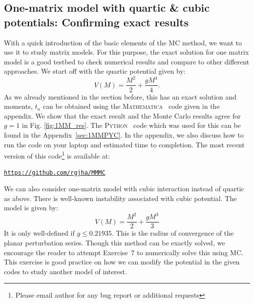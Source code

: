 \documentclass[11pt]{article}
\newcommand{\MA}{\textsc{Mathematica}}
\newcommand{\PY}{\textsc{Python}}
\begin{document}
\subsection{One-matrix model with quartic \& cubic potentials: Confirming exact results} 
With a quick introduction of the basic elements of the MC method, we want to use it to study matrix models. For this purpose, 
the exact solution for one matrix model is a good testbed to check numerical results and compare to other different approaches. 
We start off with the quartic potential given by:
\begin{equation}
	V(M) = \frac{M^2}{2} + \frac{gM^4}{4}.  
\end{equation}
As we already mentioned in the section before, this has an exact solution and moments, $t_{n}$ 
can be obtained using the \MA~ code given in the appendix. We show that the exact result and the 
Monte Carlo results agree for $g=1$ in Fig. \ref{fig:1MM_res}. The \PY~ code which was used for this 
can be found in the Appendix~\ref{sec:1MMPYC}. In the appendix, we also 
discuss how to run the code on your laptop and estimated time to completion. The most recent version of this 
code\footnote{Please email author for any bug report or additional requests} is available at:
\begin{center} \texttt{\href{https://github.com/rgjha/MMMC}{https://github.com/rgjha/MMMC}} \end{center}
We can also consider one-matrix model with cubic interaction instead of quartic as above. There is well-known instability associated with cubic potential. The model is given by:
\begin{equation}
	V(M) = \frac{M^2}{2} + \frac{gM^3}{3}  
\end{equation}
It is only well-defined if $g \le 0.21935$. This is the radius of convergence of the planar perturbation series. 
Though this method can be exactly solved, we encourage the reader to attempt Exercise~7 to numerically solve this using MC. This exercise is good practice on how we can modify the potential in the given codes to study another model of interest.
\end{document}
